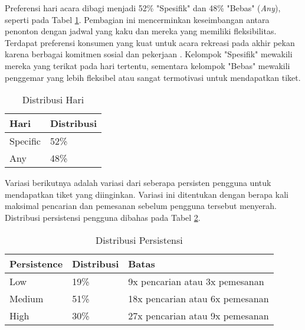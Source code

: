 Preferensi hari acara dibagi menjadi 52\% "Spesifik" dan 48\% "Bebas" (\textit{Any}), seperti pada Tabel \ref{table:distribusi-hari}. Pembagian ini mencerminkan keseimbangan antara penonton dengan jadwal yang kaku dan mereka yang memiliki fleksibilitas. Terdapat preferensi konsumen yang kuat untuk acara rekreasi pada akhir pekan karena berbagai komitmen sosial dan pekerjaan \parencite{rgate2013}. Kelompok "Spesifik" mewakili mereka yang terikat pada hari tertentu, sementara kelompok "Bebas" mewakili penggemar yang lebih fleksibel atau sangat termotivasi untuk mendapatkan tiket.

\begin{table}[H]
    \centering
    \caption{Distribusi Hari}
    \label{table:distribusi-hari}
    \begin{tabular}{|l|l|}
        \hline
        \textbf{Hari} & \textbf{Distribusi} \\
        \hline
        Specific      & 52\%                \\
        \hline
        Any           & 48\%                \\
        \hline
    \end{tabular}
\end{table}

Variasi berikutnya adalah variasi dari seberapa persisten pengguna untuk mendapatkan tiket yang diinginkan. Variasi ini ditentukan dengan berapa kali maksimal pencarian dan pemesanan sebelum pengguna tersebut menyerah. Distribusi persistensi pengguna dibahas pada Tabel \ref{table:distribusi-persistensi}.

\begin{table}[H]
    \centering
    \caption{Distribusi Persistensi}
    \label{table:distribusi-persistensi}
    \begin{tabular}{|l|l|l|}
        \hline
        \textbf{Persistence} & \textbf{Distribusi} & \textbf{Batas}                      \\
        \hline
        Low                  & 19\%                & 9x pencarian atau 3x pemesanan      \\
        \hline
        Medium               & 51\%                & 18x pencarian atau 6x     pemesanan \\
        \hline
        High                 & 30\%                & 27x pencarian atau 9x pemesanan     \\
        \hline
    \end{tabular}
\end{table}

